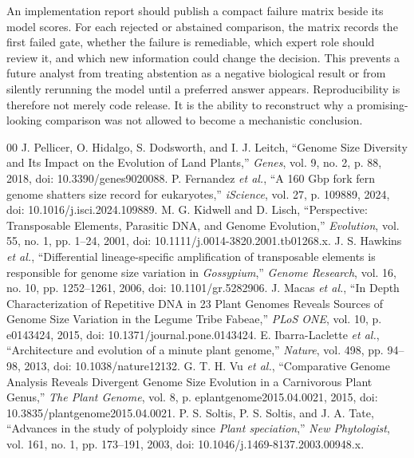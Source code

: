 \documentclass[conference]{IEEEtran}
\begin{document}
An implementation report should publish a compact failure matrix beside its model scores. For each rejected or abstained comparison, the matrix records the first failed gate, whether the failure is remediable, which expert role should review it, and which new information could change the decision. This prevents a future analyst from treating abstention as a negative biological result or from silently rerunning the model until a preferred answer appears. Reproducibility is therefore not merely code release. It is the ability to reconstruct why a promising-looking comparison was not allowed to become a mechanistic conclusion.

\begin{thebibliography}{00}
 J. Pellicer, O. Hidalgo, S. Dodsworth, and I. J. Leitch, ``Genome Size Diversity and Its Impact on the Evolution of Land Plants,'' \emph{Genes}, vol. 9, no. 2, p. 88, 2018, doi: 10.3390/genes9020088.
 P. Fernandez \emph{et al.}, ``A 160 Gbp fork fern genome shatters size record for eukaryotes,'' \emph{iScience}, vol. 27, p. 109889, 2024, doi: 10.1016/j.isci.2024.109889.
 M. G. Kidwell and D. Lisch, ``Perspective: Transposable Elements, Parasitic DNA, and Genome Evolution,'' \emph{Evolution}, vol. 55, no. 1, pp. 1--24, 2001, doi: 10.1111/j.0014-3820.2001.tb01268.x.
 J. S. Hawkins \emph{et al.}, ``Differential lineage-specific amplification of transposable elements is responsible for genome size variation in \emph{Gossypium},'' \emph{Genome Research}, vol. 16, no. 10, pp. 1252--1261, 2006, doi: 10.1101/gr.5282906.
 J. Macas \emph{et al.}, ``In Depth Characterization of Repetitive DNA in 23 Plant Genomes Reveals Sources of Genome Size Variation in the Legume Tribe Fabeae,'' \emph{PLoS ONE}, vol. 10, p. e0143424, 2015, doi: 10.1371/journal.pone.0143424.
 E. Ibarra-Laclette \emph{et al.}, ``Architecture and evolution of a minute plant genome,'' \emph{Nature}, vol. 498, pp. 94--98, 2013, doi: 10.1038/nature12132.
 G. T. H. Vu \emph{et al.}, ``Comparative Genome Analysis Reveals Divergent Genome Size Evolution in a Carnivorous Plant Genus,'' \emph{The Plant Genome}, vol. 8, p. eplantgenome2015.04.0021, 2015, doi: 10.3835/plantgenome2015.04.0021.
 P. S. Soltis, P. S. Soltis, and J. A. Tate, ``Advances in the study of polyploidy since \emph{Plant speciation},'' \emph{New Phytologist}, vol. 161, no. 1, pp. 173--191, 2003, doi: 10.1046/j.1469-8137.2003.00948.x.

\end{thebibliography}
\end{document}

